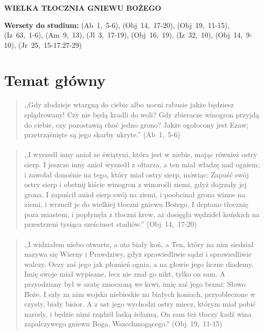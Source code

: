 \documentclass[10pt,a4paper,oneside]{article}
\begin{document}
\centerline{\textbf{\MakeUppercase{Wielka tłocznia gniewu Bożego}}}
\begin{center}
\textbf{Wersety do studium:} 
\mbox{(Ab 1, 5-6)}, \mbox{(Obj 14, 17-20)}, \mbox{(Obj 19, 11-15)}, \mbox{(Iz 63, 1-6)}, \mbox{(Am 9, 13)}, \mbox{(Jl 3, 17-19)}, \mbox{(Obj 16, 19)}, \mbox{(Iz 32, 10)}, \mbox{(Obj 14, 9-10)}, \mbox{(Jr 25, 15-17.27-29)}
\end{center}
\section{Temat główny}
\paragraph{}
\begin{quote}
,,Gdy złodzieje wtargną do ciebie albo nocni rabusie jakże będziesz splądrowany! Czy nie będą kradli do woli? Gdy zbieracze winogron przyjdą do ciebie, czy pozostawią choć jedno grono? Jakże ogołocony jest Ezaw; przetrząśnięte są jego skarby ukryte.'' \mbox{(Ab 1, 5-6)}
\end{quote}
\paragraph{}
\begin{quote}
,,I wyszedł inny anioł ze świątyni, która jest w niebie, mając również ostry sierp. I jeszcze inny anioł wyszedł z ołtarza, a ten miał władzę nad ogniem; i zawołał donośnie na tego, który miał ostry sierp, mówiąc: Zapuść swój ostry sierp i obetnij kiście winogron z winorośli ziemi, gdyż dojrzały jej grona. I zapuścił anioł sierp swój na ziemi, i poobcinał grona winne na ziemi, i wrzucił je do wielkiej tłoczni gniewu Bożego. I deptano tłocznię poza miastem, i popłynęła z tłoczni krew, aż dosięgła wędzideł końskich na przestrzeni tysiąca sześciuset stadiów.'' \mbox{(Obj 14, 17-20)}
\end{quote}
\paragraph{}
\begin{quote}
,,I widziałem niebo otwarte, a oto biały koń, a Ten, który na nim siedział nazywa się Wierny i Prawdziwy, gdyż sprawiedliwie sądzi i sprawiedliwie walczy. Oczy zaś jego jak płomień ognia, a na głowie jego liczne diademy. Imię swoje miał wypisane, lecz nie znał go nikt, tylko on sam. A przyodziany był w szatę zmoczoną we krwi, imię zaś jego brzmi: Słowo Boże. I szły za nim wojska niebieskie na białych koniach, przyobleczone w czysty, biały bisior. A z ust jego wychodzi ostry miecz, którym miał pobić narody, i będzie nimi rządził laską żelazną, On sam też tłoczy kadź wina zapalczywego gniewu Boga, Wszechmogącego.'' \mbox{(Obj 19, 11-15)}
\end{quote}
\end{document}
